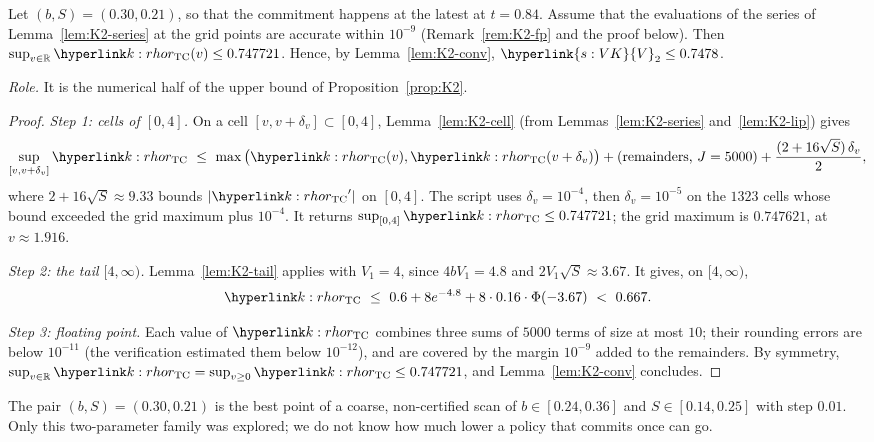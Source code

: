 \documentclass[11pt]{article}
\DeclareRobustCommand{\sy}[2]{{\hyperlink{#1}{#2}}}
\newcommand{\R}{\mathbb{R}}
\newcommand{\1}{\mathbf{1}}
\newcommand{\VK}{\sy{s:VK}{V}}
\begin{document}
\begin{proposition}\label{prop:K2-Unum}
Let $(b,S)=(0.30,0.21)$, so that the commitment happens at the latest at $t=0.84$. Assume that the evaluations of the series of Lemma~\ref{lem:K2-series} at the grid
points are accurate within $10^{-9}$ (Remark~\ref{rem:K2-fp} and the proof below). Then $\sup_{v\in\R}\kr(v)\le0.747721$. Hence, by Lemma~\ref{lem:K2-conv}, $\VK_2\le0.7478$.
\end{proposition}
\noindent\textit{Role.} It is the numerical half of the upper bound of Proposition~\ref{prop:K2}.
\begin{proof}
\textit{Step 1: cells of $[0,4]$.} On a cell $[v,v+\delta_v]\subset[0,4]$, Lemma~\ref{lem:K2-cell} (from Lemmas~\ref{lem:K2-series} and~\ref{lem:K2-lip}) gives
\[
\sup_{[v,v+\delta_v]}\kr\ \le\ \max\big(\kr(v),\kr(v+\delta_v)\big)+(\text{remainders, }J=5000)+\frac{(2+16\sqrt S)\,\delta_v}{2},
\]
where $2+16\sqrt S\approx9.33$ bounds $|\kr'|$ on $[0,4]$. The script uses $\delta_v=10^{-4}$, then $\delta_v=10^{-5}$ on the $1323$ cells whose bound exceeded the
grid maximum plus $10^{-4}$. It returns $\sup_{[0,4]}\kr\le0.747721$; the grid maximum is $0.747621$, at $v\approx1.916$.

\textit{Step 2: the tail $[4,\infty)$.} Lemma~\ref{lem:K2-tail} applies with $V_1=4$, since $4bV_1=4.8$ and $2V_1\sqrt S\approx3.67$. It gives, on $[4,\infty)$,
\[
\kr\ \le\ 0.6+8e^{-4.8}+8\cdot0.16\cdot\Phi(-3.67)\ <\ 0.667 .
\]

\textit{Step 3: floating point.} Each value of $\kr$ combines three sums of $5000$ terms of size at most $10$; their rounding errors are below $10^{-11}$ (the
verification estimated them below $10^{-12}$), and are covered by the margin $10^{-9}$ added to the remainders. By symmetry, $\sup_{v\in\R}\kr=\sup_{v\ge0}\kr\le0.747721$, and Lemma~\ref{lem:K2-conv} concludes.
\end{proof}

\noindent The pair $(b,S)=(0.30,0.21)$ is the best point of a coarse, non-certified scan of $b\in[0.24,0.36]$ and $S\in[0.14,0.25]$ with step $0.01$. Only this
two-parameter family was explored; we do not know how much lower a policy that commits once can go.
\end{document}
